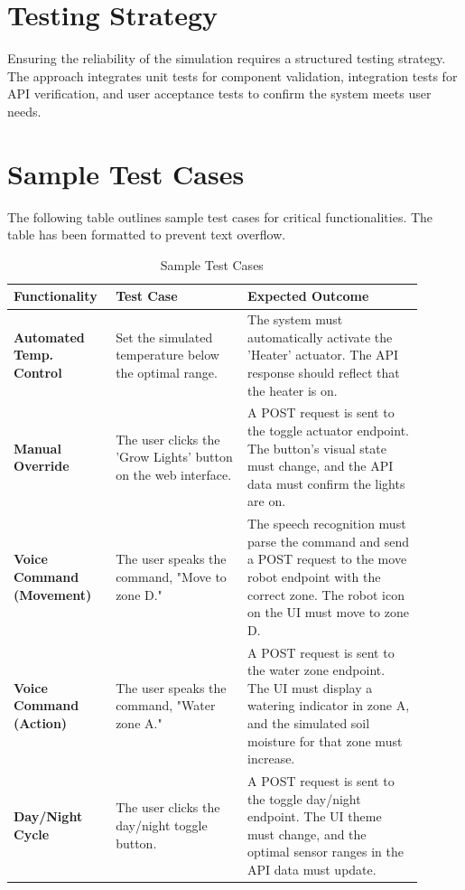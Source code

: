 \documentclass[12pt, a4paper]{report}
\begin{document}
\section{Testing Strategy}
Ensuring the reliability of the simulation requires a structured testing strategy. The approach integrates unit tests for component validation, integration tests for API verification, and user acceptance tests to confirm the system meets user needs.

\section{Sample Test Cases}
The following table outlines sample test cases for critical functionalities. The table has been formatted to prevent text overflow.

\begin{table}[H]
    \centering
    \begin{tabular}{|p{0.2\linewidth}|p{0.3\linewidth}|>{\RaggedRight\arraybackslash}p{0.4\linewidth}|}
        \hline
        \textbf{Functionality} & \textbf{Test Case} & \textbf{Expected Outcome} \\
        \hline
        \textbf{Automated Temp. Control} & Set the simulated temperature below the optimal range. & The system must automatically activate the 'Heater' actuator. The API response should reflect that the heater is on. \\
        \hline
        \textbf{Manual Override} & The user clicks the 'Grow Lights' button on the web interface. & A POST request is sent to the toggle actuator endpoint. The button's visual state must change, and the API data must confirm the lights are on. \\
        \hline
        \textbf{Voice Command (Movement)} & The user speaks the command, "Move to zone D." & The speech recognition must parse the command and send a POST request to the move robot endpoint with the correct zone. The robot icon on the UI must move to zone D. \\
        \hline
        \textbf{Voice Command (Action)} & The user speaks the command, "Water zone A." & A POST request is sent to the water zone endpoint. The UI must display a watering indicator in zone A, and the simulated soil moisture for that zone must increase. \\
        \hline
        \textbf{Day/Night Cycle} & The user clicks the day/night toggle button. & A POST request is sent to the toggle day/night endpoint. The UI theme must change, and the optimal sensor ranges in the API data must update. \\
        \hline
    \end{tabular}
    \caption{Sample Test Cases}
    \label{tab:testcases}
\end{table}
\end{document}
